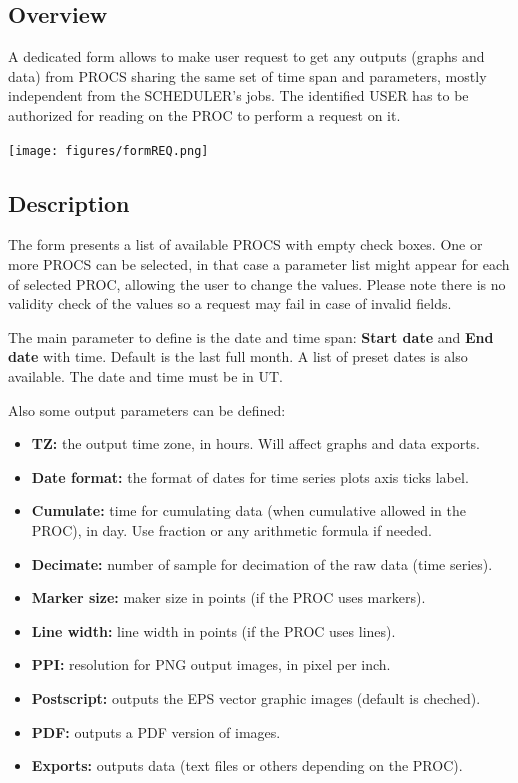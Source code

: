 \subsection{Overview}

A dedicated form  allows to make user request to get any outputs (graphs and data) from PROCS sharing the same set of time span and parameters, mostly independent from the SCHEDULER's jobs. The identified USER has to be authorized for reading on the PROC to perform a request on it.

\texttt{[image: figures/formREQ.png]}

\subsection{Description}

The form presents a list of available PROCS with empty check boxes. One or more PROCS can be selected, in that case a parameter list might appear for each of selected PROC, allowing the user to change the values. Please note there is no validity check of the values so a request may fail in case of invalid fields.

The main parameter to define is the date and time span: \textbf{Start date} and \textbf{End date} with time. Default is the last full month. A list of preset dates is also available. The date and time must be in UT. 

Also some output parameters can be defined:
\begin{itemize}
\item \textbf{TZ:} the output time zone, in hours. Will affect graphs and data exports.
\item \textbf{Date format:} the format of dates for time series plots axis ticks label.
\item \textbf{Cumulate:} time for cumulating data (when cumulative allowed in the PROC), in day. Use fraction or any arithmetic formula if needed.
\item \textbf{Decimate:} number of sample for decimation of the raw data (time series).
\item \textbf{Marker size:} maker size in points (if the PROC uses markers).
\item \textbf{Line width:} line width in points (if the PROC uses lines).
\item \textbf{PPI:} resolution for PNG output images, in pixel per inch.
\item \textbf{Postscript:} outputs the EPS vector graphic images (default is cheched).
\item \textbf{PDF:} outputs a PDF version of images.
\item \textbf{Exports:} outputs data (text files or others depending on the PROC).
\end{itemize}

